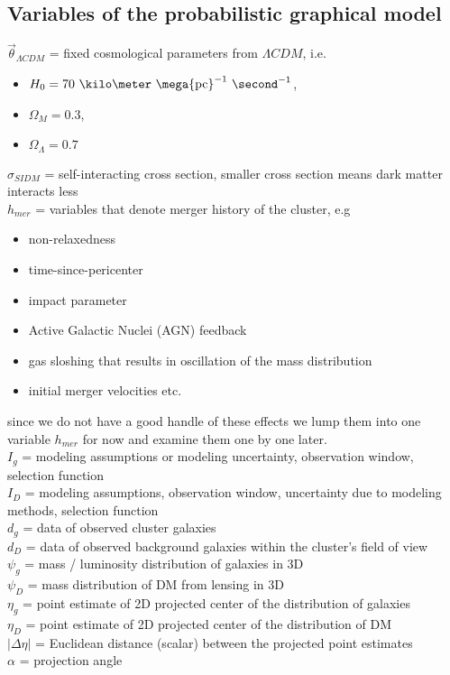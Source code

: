 \subsection{Variables of the probabilistic graphical model}
$\vec{\theta}_{\Lambda CDM}$ = fixed cosmological parameters from $\Lambda
CDM$, i.e. 
\begin{itemize}
	\item $H_0 = 70~\kilo\meter~\mega {\rm pc}^{-1}~\second^{-1}$, 
	\item $\Omega_M = 0.3$, 
	\item $\Omega_\Lambda = 0.7$
\end{itemize}  
$\sigma_{SIDM}$ = self-interacting cross section, smaller cross section means dark
matter interacts less \\  
$h_{mer}$ = variables that denote merger history of the cluster, 
e.g 
\begin{itemize}
	\item non-relaxedness 
	\item time-since-pericenter
	\item impact parameter
	\item Active Galactic Nuclei (AGN) feedback
	\item gas sloshing that results in oscillation of the mass distribution 
	\item initial merger velocities etc.
\end{itemize}
since we do not have a good handle of these effects we lump them into one
variable $h_{mer}$ for now and examine them one by one later. 
\\    
$I_{g}$ = modeling assumptions or modeling uncertainty, observation window, 
selection function\\ 
$I_{D}$ = modeling assumptions, observation window, uncertainty due to modeling
methods, selection function\\   
$d_{g}$ = data of observed cluster galaxies  \\ 
$d_{D}$ = data of observed background galaxies within the cluster's field of
view  \\ 
$\psi_{g}$ = mass / luminosity distribution of galaxies in 3D  \\ 
$\psi_{D}$ = mass distribution of DM from lensing in 3D \\ 
$\eta_{g}$ = point estimate of 2D projected center of the distribution of galaxies \\ 
$\eta_{D}$ = point estimate of 2D projected center of the distribution of DM \\ 
$|\Delta \eta|$ = Euclidean distance (scalar) between the projected point estimates\\   
$\alpha$ = projection angle\\ 



\section{} 
